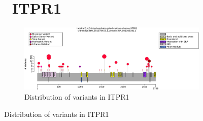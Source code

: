 \begin{figure}[htbp]
\section*{ ITPR1}
\centering
\begin{subfigure}[b]{0.95\textwidth}
\centering
\includegraphics[width=\textwidth]{ img/ITPR1_protein_diagram.pdf} 
\captionsetup{justification=raggedright,singlelinecheck=false}
\caption{Distribution of variants in ITPR1}
\end{subfigure}

\vspace{0.2em}


\end{figure}
